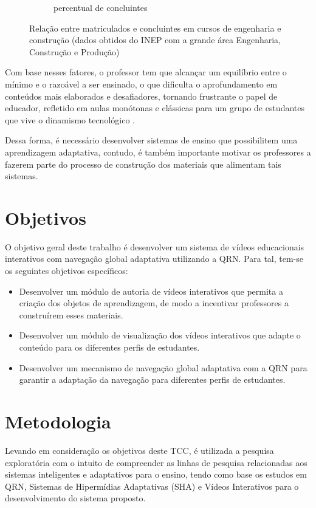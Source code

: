 \begin{figure}
\begin{subfigure}{.5\textwidth}
  		\caption{percentual de concluintes}
  		\label{fig:submat2}
	\end{subfigure}
	\caption{Relação entre matriculados e concluintes em cursos de engenharia e construção
	(dados obtidos do INEP com a grande área Engenharia, Construção e Produção)}
	\label{fig:matriculados}
\end{figure}

Com base nesses fatores, o professor tem que alcançar um equilíbrio entre o mínimo e o razoável a ser ensinado, o que dificulta o aprofundamento em conteúdos mais elaborados e desafiadores, tornando frustrante o papel de educador, refletido em aulas monótonas e clássicas para um grupo de estudantes que vive o dinamismo tecnológico \cite{fragelli2010}.

Dessa forma, é necessário desenvolver sistemas de ensino que possibilitem uma aprendizagem adaptativa, contudo, é também importante motivar os professores a fazerem parte do processo de construção dos materiais que alimentam tais sistemas.

\section[Objetivos]{Objetivos}

O objetivo geral deste trabalho é desenvolver um sistema de vídeos educacionais interativos com navegação global adaptativa utilizando a QRN. Para tal, tem-se os seguintes objetivos específicos:
\begin{itemize}
  	\item Desenvolver um módulo de autoria de vídeos interativos que permita a criação dos objetos de aprendizagem, de modo a incentivar professores a construírem esses materiais.
  	\item Desenvolver um módulo de visualização dos vídeos interativos que adapte o conteúdo para os diferentes perfis de estudantes.
  	\item Desenvolver um mecanismo de navegação global adaptativa com a QRN para garantir a adaptação da navegação para diferentes perfis de estudantes.
\end{itemize}

\section[Metodologia]{Metodologia}
Levando em consideração os objetivos deste TCC, é utilizada a pesquisa exploratória com o intuito de compreender as linhas de pesquisa relacionadas aos sistemas inteligentes e adaptativos para o ensino, tendo como base os estudos em QRN, Sistemas de Hipermídias Adaptativas (SHA) e Vídeos Interativos para o desenvolvimento do sistema proposto.

